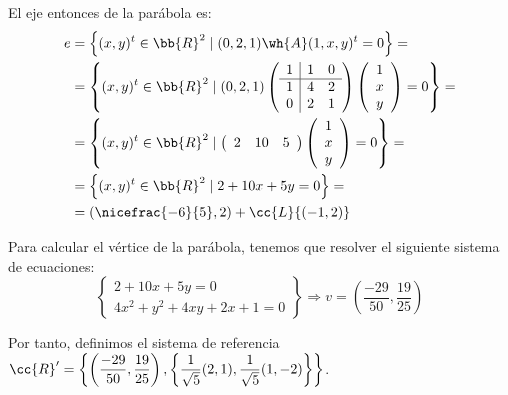 \begin{ejercicio}
\begin{enumerate}
        El eje entonces de la parábola es:
        \begin{equation*}
            \begin{split}
                e&=\left\{(x,y)^t\in \bb{R}^2 \mid (0,2,1)\wh{A}(1,x,y)^t=0\right\}=\\
                &= \left\{(x,y)^t\in \bb{R}^2 \mid (0,2,1) \left(\begin{array}{c|cc}
                1 & 1 & 0  \\ \hline
                1 & 4 & 2 \\
                0 &  2 & 1
            \end{array}\right)
             \left(\begin{array}{c}
                1 \\
                x \\
                y
            \end{array}\right)
            =0\right\} =\\
            &= \left\{(x,y)^t\in \bb{R}^2 \mid \left(\begin{array}{ccc}
                2 & 10 & 5
            \end{array}\right)
             \left(\begin{array}{c}
                1 \\
                x \\
                y
            \end{array}\right)
            =0\right\} =\\
            &= \left\{(x,y)^t\in \bb{R}^2 \mid 2+10x+5y=0\right\} =\\
            &= \left(\nicefrac{-6}{5}, 2\right)+\cc{L}\{(-1,2)\}
            \end{split}
        \end{equation*}

        Para calcular el vértice de la parábola, tenemos que resolver el siguiente sistema de ecuaciones:
        \begin{equation*}
            \left\{
            \begin{array}{l}
                2+10x+5y=0 \\
                4x^2+y^2+4xy+2x+1=0
            \end{array}
            \right\}\Longrightarrow v=\left(\frac{-29}{50},\frac{19}{25}\right)
        \end{equation*}

        Por tanto, definimos el sistema de referencia $\cc{R}'=\left\{\left(\dfrac{-29}{50},\dfrac{19}{25}\right), \left\{\dfrac{1}{\sqrt{5}}(2,1), \dfrac{1}{\sqrt{5}}(1,-2)\right\}\right\}$.


\end{enumerate}
\end{ejercicio}
